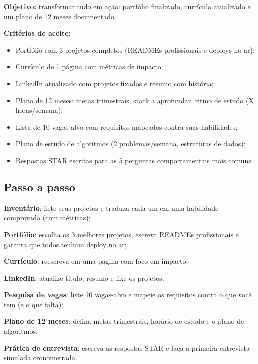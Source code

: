 \begin{caixaprojeto}
\textbf{Objetivo:} transformar tudo em ação: portfólio finalizado, currículo
atualizado e um plano de 12 meses documentado.

\textbf{Critérios de aceite:}
\begin{itemize}[leftmargin=*, itemsep=0.2em]
  \item Portfólio com 3 projetos completos (READMEs profissionais e deploys no ar);
  \item Currículo de 1 página com métricas de impacto;
  \item LinkedIn atualizado com projetos fixados e resumo com história;
  \item Plano de 12 meses: metas trimestrais, stack a aprofundar, ritmo de estudo (X horas/semana);
  \item Lista de 10 vagas-alvo com requisitos mapeados contra suas habilidades;
  \item Plano de estudo de algoritmos (2 problemas/semana, estruturas de dados);
  \item Respostas STAR escritas para as 5 perguntas comportamentais mais comuns.
\end{itemize}
\end{caixaprojeto}

\subsection{Passo a passo}

\begin{passos}
  \item \textbf{Inventário}: liste seus projetos e traduza cada um em uma
  habilidade comprovada (com métricas);
  \item \textbf{Portfólio}: escolha os 3 melhores projetos, escreva READMEs
  profissionais e garanta que todos tenham deploy no ar;
  \item \textbf{Currículo}: reescreva em uma página com foco em impacto;
  \item \textbf{LinkedIn}: atualize título, resumo e fixe os projetos;
  \item \textbf{Pesquisa de vagas}: liste 10 vagas-alvo e mapeie os requisitos
  contra o que você tem (e o que falta);
  \item \textbf{Plano de 12 meses}: defina metas trimestrais, horário de
  estudo e o plano de algoritmos;
  \item \textbf{Prática de entrevista}: escreva as respostas STAR e faça a
  primeira entrevista simulada cronometrada.
\end{passos}


